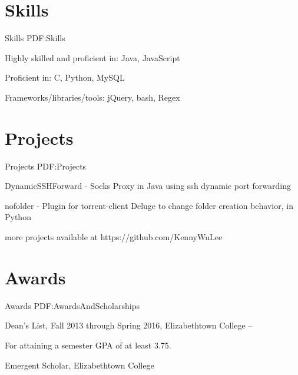 \documentclass[letterpaper,MMMyyyy,nonstop]{simpleresumecv}
\begin{document}
\begin{body}
\bigskip


\section
{Skills}
{Skills}
{PDF:Skills}

\BulletItem
Highly skilled and proficient in: Java, JavaScript

\Gap
\BulletItem
Proficient in: C, Python, MySQL

\Gap
\BulletItem
Frameworks/libraries/tools: jQuery, bash, Regex

\bigskip


\section
{Projects}
{Projects}
{PDF:Projects}

\BulletItem
DynamicSSHForward - Socks Proxy in Java using ssh dynamic port forwarding

\Gap
\BulletItem
nofolder - Plugin for torrent-client Deluge to change folder creation behavior, in Python

\Gap
\SubItem
more projects available at https://github.com/KennyWuLee

\bigskip


\section
{Awards}
{Awards}
{PDF:AwardsAndScholarships}

\BulletItem
Dean's List,
Fall 2013 through Spring 2016,
Elizabethtown College
\hfill
{} --
\begin{detail}
\SubItem
For attaining a semester GPA of at least 3.75.
\end{detail}

\Gap
\BulletItem
Emergent Scholar,
Elizabethtown College
\hfill
{}

\end{body}
\end{document}
